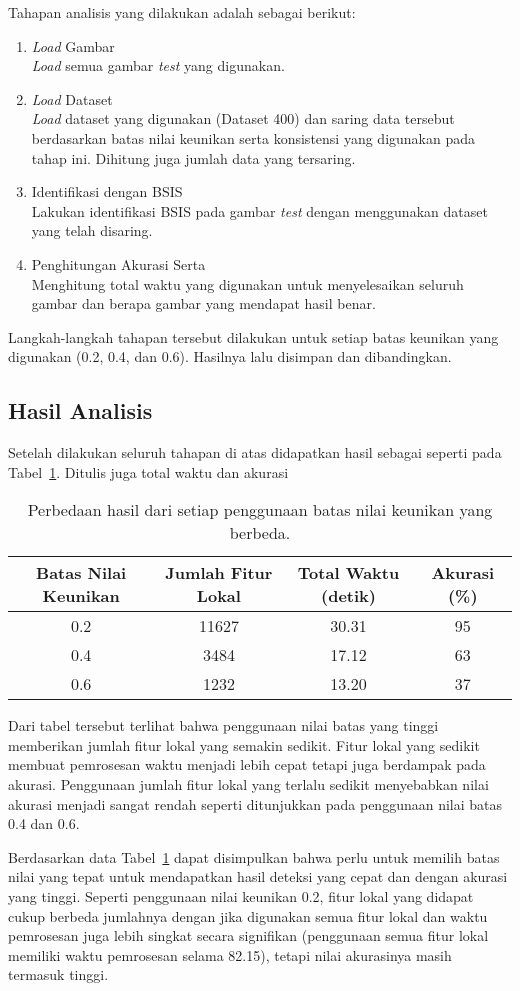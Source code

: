Tahapan analisis yang dilakukan adalah sebagai berikut:
\begin{enumerate}
	\item \textit{Load} Gambar \\
	\textit{Load} semua gambar \textit{test} yang digunakan.
	\item \textit{Load} Dataset \\
	\textit{Load} dataset yang digunakan (Dataset 400) dan saring data tersebut berdasarkan batas nilai keunikan serta konsistensi yang digunakan pada tahap ini. Dihitung juga jumlah data yang tersaring.
	\item Identifikasi dengan BSIS \\
	Lakukan identifikasi BSIS pada gambar \textit{test} dengan menggunakan dataset yang telah disaring.
	\item Penghitungan Akurasi Serta \\
	Menghitung total waktu yang digunakan untuk menyelesaikan seluruh gambar dan berapa gambar yang mendapat hasil benar.
\end{enumerate}
Langkah-langkah tahapan tersebut dilakukan untuk setiap batas keunikan yang digunakan (0.2, 0.4, dan 0.6). Hasilnya lalu disimpan dan dibandingkan.

\subsection{Hasil Analisis}
Setelah dilakukan seluruh tahapan di atas didapatkan hasil sebagai seperti pada Tabel~\ref{tab:nilai_keunikan}. Ditulis juga total waktu dan akurasi 
\begin{table}[H]
	\centering
	\begin{tabular}{|c|c|c|c|}
		\hline
		Batas Nilai Keunikan & Jumlah Fitur Lokal & Total Waktu (detik) & Akurasi (\%) \\
		\hline
		0.2 & 11627 & 30.31 & 95 \\
		\hline
		0.4 & 3484 & 17.12 & 63 \\
		\hline
		0.6 & 1232 & 13.20 & 37 \\
		\hline
	\end{tabular}
	\caption{Perbedaan hasil dari setiap penggunaan batas nilai keunikan yang berbeda.}
	\label{tab:nilai_keunikan}
\end{table}
Dari tabel tersebut terlihat bahwa penggunaan nilai batas yang tinggi memberikan jumlah fitur lokal yang semakin sedikit. Fitur lokal yang sedikit membuat pemrosesan waktu menjadi lebih cepat tetapi juga berdampak pada akurasi. Penggunaan jumlah fitur lokal yang terlalu sedikit menyebabkan nilai akurasi menjadi sangat rendah seperti ditunjukkan pada penggunaan nilai batas 0.4 dan 0.6.

Berdasarkan data Tabel~\ref{tab:nilai_keunikan} dapat disimpulkan bahwa perlu untuk memilih batas nilai yang tepat untuk mendapatkan hasil deteksi yang cepat dan dengan akurasi yang tinggi. Seperti penggunaan nilai keunikan 0.2, fitur lokal yang didapat cukup berbeda jumlahnya dengan jika digunakan semua fitur lokal dan waktu pemrosesan juga lebih singkat secara signifikan (penggunaan semua fitur lokal memiliki waktu pemrosesan selama 82.15), tetapi nilai akurasinya masih termasuk tinggi.
